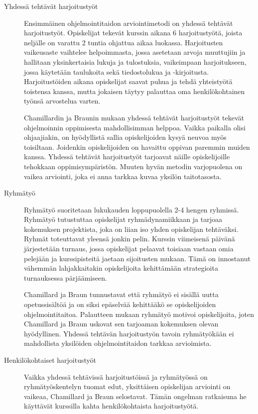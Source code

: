 \documentclass[finnish]{../tktltiki2}
\theoremstyle{definition}
\theoremstyle{remark}
\begin{document}
\begin{description}

\item[Yhdessä tehtävät harjoitustyöt] \hfill

Ensimmäinen ohjelmointitaidon arviointimetodi on yhdessä tehtävät harjoitustyöt. Opiskelijat tekevät kurssin aikana 6 harjoitustyötä, joista neljälle on varattu 2 tuntia ohjattua aikaa luokassa. Harjoitusten vaikeusaste vaihtelee helpoimmasta, jossa asetetaan arvoja muuttujiin ja hallitaan yksinkertaisia lukuja ja tulostuksia, vaikeimpaan harjoitukseen, jossa käytetään taulukoita sekä tiedostolukua ja -kirjoitusta. Harjoitustöiden aikana opiskelijat saavat puhua ja tehdä yhteistyötä toistensa kanssa, mutta jokaisen täytyy palauttaa oma henkilökohtainen työnsä arvostelua varten.

Chamillardin ja Braunin mukaan yhdessä tehtävät harjoitustyöt tekevät ohjelmoinnin oppimisesta mahdollisimman helppoa. Vaikka paikalla olisi ohjaajiakin, on hyödyllistä sallia opiskelijoiden kysyä neuvoa myös toisiltaan. Joidenkin opiskelijoiden on havaittu oppivan paremmin muiden kanssa. Yhdessä tehtävät harjoitustyöt tarjoavat näille opiskelijoille tehokkaan oppimisympäristön. Muuten hyvän metodin varjopuolena on vaikea arviointi, joka ei anna tarkkaa kuvaa yksilön taitotasosta.

\item[Ryhmätyö] \hfill

Ryhmätyö suoritetaan lukukauden loppupuolella 2-4 hengen ryhmissä. Ryhmätyö tutustuttaa opiskelijat ryhmädynamiikkaan ja tarjoaa kokemuksen projektista, joka on liian iso yhden opiskelijan tehtäväksi. Ryhmät toteuttavat yleensä jonkin pelin. Kurssin viimeisenä päivänä järjestetään turnaus, jossa opiskelijat pelaavat toisiaan vastaan omia pelejään ja kurssipisteitä jaetaan sijoitusten mukaan. Tämä on innostanut vähemmän lahjakkaitakin opiskelijoita kehittämään strategioita turnauksessa pärjäämiseen.

Chamillard ja Braun tunnustavat että ryhmätyö ei sisällä uutta opetussisältöä ja on siksi epäselvää kehittääkö se opiskelijoiden ohjelmointitaitoa. Palautteen mukaan ryhmätyö motivoi opiskelijoita, joten Chamillard ja Braun uskovat sen tarjoaman kokemuksen olevan hyödyllinen. Yhdessä tehtävän harjoitustyön tavoin ryhmätyökään ei mahdollista yksilöiden ohjelmointitaidon tarkkaa arvioimista.

\item[Henkilökohtaiset harjoitustyöt] \hfill

Vaikka yhdessä tehtävissä harjoitustöissä ja ryhmätyössä on ryhmä\-työskentelyn tuomat edut, yksittäisen opiskelijan arviointi on vaikeaa, Chamillard ja Braun selostavat. Tämän ongelman ratkaisuna he käyttävät kurssilla kahta henkilökohtaista harjoitustyötä.


\end{description}
\end{document}
